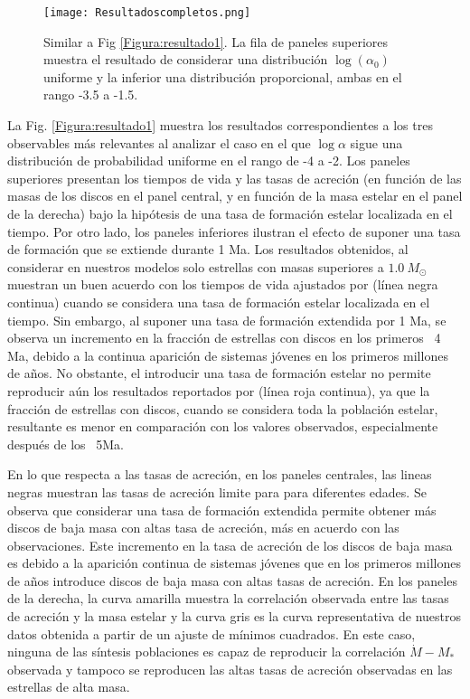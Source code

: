\documentclass[baaa]{baaa}
\begin{document}
\begin{figure*}[!ht]
\centering
\texttt{[image: Resultadoscompletos.png]}
\caption{Similar a Fig \ref{Figura:resultado1}. La fila de paneles superiores muestra el resultado de considerar una distribución $\log(\alpha_0)$ uniforme y la inferior una distribución proporcional, ambas en el rango -3.5 a -1.5. 
}
\label{Figura:resultado2}
\end{figure*}

La Fig. \ref{Figura:resultado1} muestra los resultados correspondientes a los tres observables más relevantes al analizar el caso en el que $\log \alpha$ sigue una distribución de probabilidad uniforme en el rango de -4 a -2. Los paneles superiores presentan los tiempos de vida y las tasas de acreción (en función de las masas de los discos en el panel central, y en función de la masa estelar en el panel de la derecha) bajo la hipótesis de una tasa de formación estelar localizada en el tiempo. Por otro lado, los paneles inferiores ilustran el efecto de suponer una tasa de formación que se extiende durante 1 Ma. Los resultados obtenidos, al considerar en nuestros modelos solo estrellas con masas 
superiores a $1.0~{M}_{\odot}$ muestran un buen acuerdo con los tiempos de vida ajustados por \cite{MamajekE} (línea negra continua) cuando se considera una tasa de formación estelar localizada en el tiempo. Sin embargo, al suponer una tasa de formación extendida por 1 Ma, se observa un incremento en la fracción de estrellas con discos en los primeros ~4 Ma, debido a la continua aparición de sistemas jóvenes en los primeros millones de años. No obstante, el introducir una tasa de formación estelar no permite reproducir aún los resultados reportados por \cite{Pfalzner_2022} (línea roja continua), ya que la fracción de estrellas con discos, cuando se considera toda la población estelar, resultante es menor en comparación con los valores observados, especialmente después de los ~5Ma.

En lo que respecta a las tasas de acreción, en los paneles centrales, las lineas negras muestran las tasas de acreción limite para para diferentes edades. Se observa que considerar una tasa de formación extendida permite obtener más discos de baja masa con altas tasa de acreción, más en acuerdo con las observaciones. Este incremento en la tasa de acreción de los discos de baja masa es debido a la aparición continua de sistemas jóvenes que en los primeros millones de años introduce discos de baja masa con altas tasas de acreción. En los paneles de la derecha, la curva amarilla muestra la correlación observada entre las tasas de acreción y la masa estelar y la curva gris es la curva representativa de nuestros datos obtenida a partir de un ajuste de mínimos cuadrados. En este caso, ninguna de las síntesis poblaciones es capaz de reproducir la correlación $\dot{M} - M_*$ observada y tampoco se reproducen las altas tasas de acreción observadas en las estrellas de alta masa.
\end{document}
